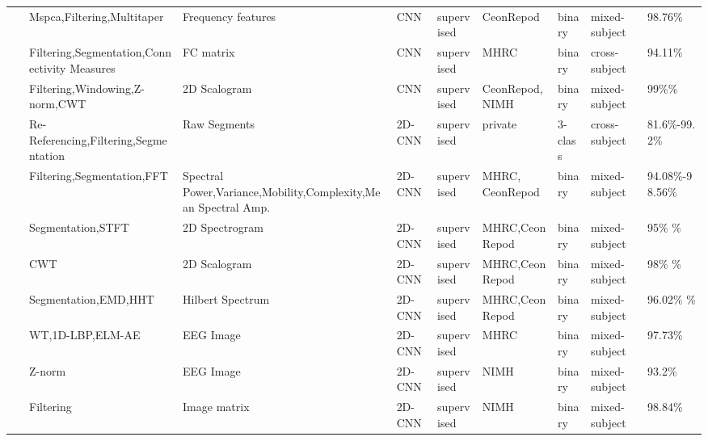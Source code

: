 \begin{table*}[ht]
\begin{tabular}{p{0.4cm}p{2.8cm}p{2cm}p{1.5cm}p{1.9cm}p{1.9cm}p{0.8cm}p{1.8cm}p{2cm}}
~\cite{SZ11} & Mspca,Filtering,Multitaper & Frequency features & CNN & supervised & CeonRepod & binary & mixed-subject & 98.76\% \\
~\cite{SZ12} & Filtering,Segmentation,\newline Connectivity Measures & FC matrix & CNN & supervised & MHRC & binary & cross-subject & 94.11\% \\
~\cite{SZ13} & Filtering,Windowing,\newline Z-norm,CWT & 2D Scalogram & CNN & supervised & CeonRepod,\newline NIMH & binary & mixed-subject & 99\%\newline 96\% \\
~\cite{SZ14} & Re-Referencing,\newline Filtering,Segmentation & Raw Segments & 2D-CNN & supervised & private & 3-class & cross-subject & 81.6\%-99.2\%\\
~\cite{SZ15} & Filtering,Segmentation,FFT & Spectral Power,\newline Variance,Mobility,\newline Complexity,Mean Spectral Amp. & 2D-CNN & supervised & MHRC, \newline CeonRepod & binary & mixed-subject & 94.08\%-98.56\% \\
~\cite{SZ16} & Segmentation,STFT & 2D Spectrogram & 2D-CNN & supervised & MHRC,\newline CeonRepod & binary & mixed-subject & 95\% \newline 97\%\\
~\cite{aslan2022deep} & CWT & 2D Scalogram & 2D-CNN & supervised & MHRC,\newline CeonRepod & binary & mixed-subject & 98\% \newline 99.5\%
 \\
~\cite{zulfikar2022empirical} & Segmentation,EMD,HHT & Hilbert Spectrum & 2D-CNN & supervised & MHRC,\newline CeonRepod & binary & mixed-subject & 96.02\% \newline 98.2\%\\
~\cite{9713847} & WT,1D-LBP,ELM-AE & EEG Image & 2D-CNN & supervised & MHRC & binary & mixed-subject & 97.73\% \\
~\cite{electronics11142265} & Z-norm & EEG Image & 2D-CNN & supervised & NIMH & binary & mixed-subject & 93.2\% \\
~\cite{SZ21} & Filtering & Image matrix & 2D-CNN & supervised & NIMH & binary & mixed-subject & 98.84\% \\

\end{tabular}
\end{table*}
